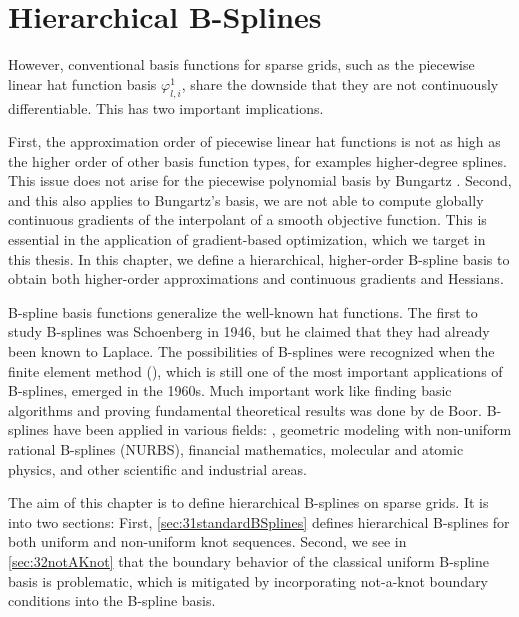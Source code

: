 
\chapter{Hierarchical B-Splines}
\label{chap:30BSplines}




However, conventional basis functions for sparse grids,
such as the piecewise linear hat function basis $\varphi_{l,i}^1$,
share the downside that they are not continuously differentiable.
This has two important implications.

First, the approximation order of piecewise linear hat functions
is not as high as the higher order of other basis function types,
for examples higher-degree splines.
This issue does not arise for the piecewise polynomial basis
by Bungartz \cite{Bungartz98Finite}.
Second, and this also applies to Bungartz's basis,
we are not able to compute globally continuous gradients of the
interpolant of a smooth objective function.
This is essential in the application of gradient-based optimization,
which we target in this thesis.
In this chapter, we define a hierarchical, higher-order B-spline basis
to obtain both higher-order approximations
and continuous gradients and Hessians.

B-spline basis functions generalize the well-known hat functions.
The first to study B-splines was Schoenberg in 1946,
but he claimed that they had already been known to Laplace.
%
The possibilities of B-splines were recognized when
the finite element method (\fem),
which is still one of the most important applications of B-splines,
emerged in the 1960s.
Much important work like finding basic algorithms and proving fundamental
theoretical results was done by de Boor.
B-splines have been applied in various fields:
\fem,
geometric modeling with non-uniform rational B-splines (NURBS),
financial mathematics,
molecular and atomic physics,
and other scientific and industrial areas.

The aim of this chapter is to define hierarchical B-splines on sparse grids.
It is into two sections:
First, \cref{sec:31standardBSplines} defines hierarchical B-splines for both
uniform and non-uniform knot sequences.
Second, we see in \cref{sec:32notAKnot} that the boundary behavior
of the classical uniform B-spline basis is problematic,
which is mitigated by incorporating not-a-knot boundary conditions
into the B-spline basis.





